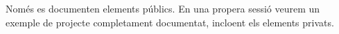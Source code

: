 Només es documenten elements públics. En una propera sessió veurem un exemple de projecte completament documentat, incloent els elements privats. 